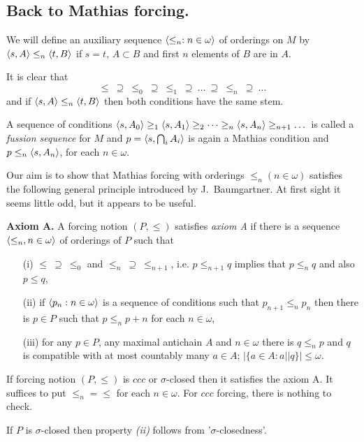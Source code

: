 \subsection{${}$Back to Mathias forcing.}\label{M-order}

We will define an   auxiliary sequence $\langle \leq_n : n \in \omega \rangle$
of orderings on $M$ by $\langle s,A \rangle \leq_n \langle t,B\rangle$ if $s=t$, $A \subset B$
and first $n$ elements of $B$ are in $A$.

\smallskip

It is clear that
$$
\leq \ \supseteq \ \leq_0 \ \supseteq \ \leq_1 \ \supseteq \ \dots \ \supseteq \ \leq_n \ \supseteq \ \dots
$$
and if $\langle s,A\rangle \leq_n \langle t,B\rangle$ then both conditions have the same stem.

\smallskip

A sequence of conditions $\langle s,A_0\rangle \geq_1 \langle s,A_1\rangle \geq_2 \dots \geq_n \langle s,A_n\rangle
	\geq_{n+1} \dots$ is called a \emph{fussion sequence} for $M$
and $p=\langle s,\bigcap_i A_i\rangle$ is again a Mathias condition and
$p \leq_n \langle s,A_n\rangle$, for each $n \in \omega$.

Our aim is to show that Mathias forcing with orderings $\leq_n (n \in \omega)$
satisfies the following general principle introduced by J.~Baumgartner.
At first sight it seems little odd, but it appears to be useful.

\begin{definition}
 {\bf Axiom A.} A forcing notion $(P,\leq)$ satisfies \emph{axiom A}
if there is a sequence $\langle \leq_n, n \in \omega \rangle$ of orderings
of $P$ such that
\begin{itemize}
 \item[(i)] $\leq \ \supseteq \ \leq_0$ and $\leq_n \ \supseteq \ \leq_{n+1}$,
	i.e. $p \leq_{n+1} q$ implies that $p \leq_n q$ and also $p \leq q$,
 \item[(ii)] if $\langle p_n : n \in \omega \rangle$ is a sequence of conditions
	such that $p_{n+1} \leq_n p_n$ then there is $p \in P$ such
	that $p \leq_n p+n$ for each $n \in \omega$,
 \item[(iii)] for any $p \in P$, any maximal antichain $A$ and $n \in \omega$
	there is $q \leq_n p$ and $q$ is compatible with at most countably
	many $a \in A$; $|\{a \in A : a || q \}|\leq\omega$.
\end{itemize}
\end{definition}

\begin{example}
 If forcing notion $(P,\leq)$ is $ccc$ or $\sigma$-closed then it
satisfies the axiom A. It suffices to put $\leq_n = \leq$ for
each $n \in \omega$. For $ccc$ forcing, there is nothing to check.

If $P$ is $\sigma$-closed then property {\itshape (ii)} follows
from '$\sigma$-closedness'.
\end{example}


